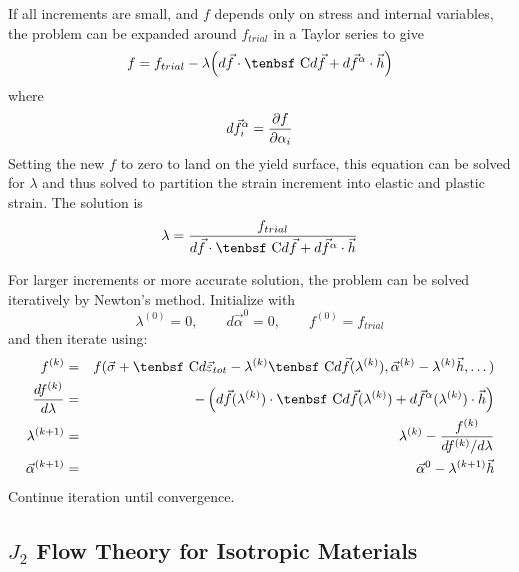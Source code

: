 \documentclass[11pt]{article}
\def\C{\hbox{\tenbsf C}}
\def\deff{d \vec{\varepsilon}_{tot}}
\def\df{d \vec{f}}
\def\dfa{d \vec{f}^\alpha}
\def\da{d\vec{\alpha}}
\def\s#1{\sigma_{#1}}
\begin{document}
If all increments are small, and $f$ depends only on stress and internal variables, the problem can be expanded around $f_{trial}$ in a Taylor series to give
\begin{equation}
    f  = f_{trial} - \lambda\Bigl( \df \cdot \C \df + \dfa \cdot \vec h \Bigr)
\end{equation}
where
\begin{equation}
\dfa_i = {\partial f\over \partial\alpha_i}
\end{equation}
Setting the new $f$ to zero to land on the yield surface, this equation can be solved for $\lambda$ and thus solved to partition the strain increment into elastic and plastic strain. The solution is
\begin{equation}
        \lambda = { f_{trial}   \over  \df\cdot \C\df + \dfa \cdot \vec h }
\end{equation}

For larger increments or more accurate solution, the problem can be solved iteratively by Newton's method. Initialize with
\begin{equation}
        \lambda^{(0)} = 0, \qquad  \da^{0}=0, \qquad f^{(0)}=f_{trial}
\end{equation}
and then iterate using:
\begin{eqnarray}
        f^{(k)} & = &  f(\vec\s{} + \C \deff - \lambda^{(k)}\C\df(\lambda^{(k)}),\vec\alpha^{(k)} -\lambda^{(k)} \vec h,\dots)  \\
        {df^{(k)}\over d\lambda} & = & -\left( \df(\lambda^{(k)})\cdot \C\df(\lambda^{(k)}) + \dfa(\lambda^{(k)}) \cdot \vec h\right) \\
        \lambda^{(k+1)} & = & \lambda^{(k)} - {f^{(k)} \over {df^{(k)}/ d\lambda} } \\
        \vec\alpha^{(k+1)} & = & \vec\alpha^{0} -  \lambda^{(k+1)} \vec h
\end{eqnarray}
Continue iteration until convergence.

\subsection{$J_2$ Flow Theory for Isotropic Materials}
\end{document}
